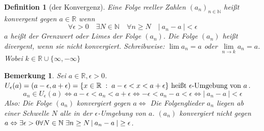 \documentclass[a4paper,titlepage,oneside]{article}
\def\N{\ensuremath{\mathbb{N}} }
\def\R{\ensuremath{\mathbb{R}} }
\def\sp{\hspace{0,1cm}}
\newcommand{\abs}[1]{\ensuremath{\left|\:#1\:\right|}}
\newcommand{\menge}[2]{\ensuremath{\{#1\sp : \sp #2\}}}
\theoremstyle{thmstyle}
\newtheorem{defi}[satz]{Definition}
\newtheorem{bem}[satz]{Bemerkung}
\begin{document}
\begin{defi}[der Konvergenz]
Eine Folge reeller Zahlen \((a_n)_{n\in\N}\) heißt konvergent gegen \( a\in\R\) wenn 
\[\forall \epsilon > 0 \quad \exists N \in \N \quad \forall n \ge N \quad \abs{a_n - a} < \epsilon\]
\(a\) heißt der Grenzwert oder Limes der Folge \((a_n)\). Die Folge \((a_n)\) heißt divergent, wenn sie nicht konvergiert. Schreibweise: \(\lim{a_n} = a \) oder \( \lim\limits_{n \to k}{a_n} = a \). Wobei \( k \in \R\cup\{\infty, -\infty\}\)
\end{defi}

\begin{bem}
Sei \(a \in \R, \epsilon > 0\). \(U_\epsilon(a) = (a-\epsilon, a+\epsilon) = \menge{x \in \R}{a - \epsilon < x < a + \epsilon} \text{ heißt } \epsilon\text{-Umgebung von }a\).
\[ a_n \in U_\epsilon(a) \Leftrightarrow a-\epsilon < a_n < a + \epsilon \Leftrightarrow -\epsilon < a_n - a < \epsilon \Leftrightarrow \abs{a_n - a} < \epsilon\]
Also: Die Folge \((a_n)\) konvergiert gegen \(a \Leftrightarrow \) Die Folgenglieder \(a_n\) liegen ab einer Schwelle \(N\) alle in der \(\epsilon\)-Umgebung von \(a\). \((a_n)\) konvergiert nicht gegen \(a \Leftrightarrow \exists \epsilon > 0 \forall N\in\N \sp \exists n \ge N \abs{a_n - a} \ge \epsilon\).
\end{bem}
\end{document}
